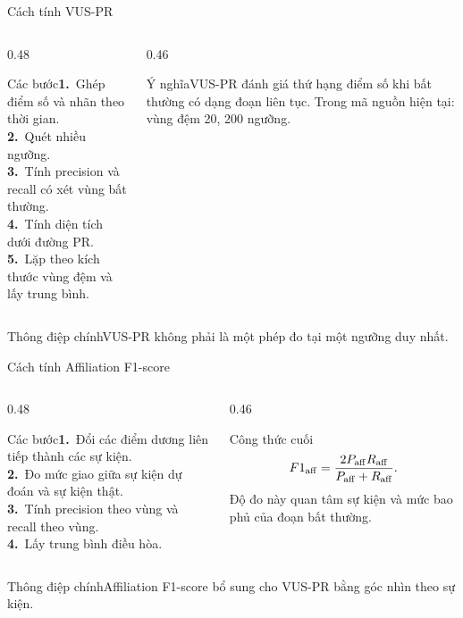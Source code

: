 \documentclass[aspectratio=169]{beamer}
\newcommand{\takeaway}[1]{\begin{alertblock}{Thông điệp chính}#1\end{alertblock}}
\newcommand{\step}[2]{\textbf{#1.}~#2}
\begin{document}
\begin{frame}{Cách tính VUS-PR}
  \begin{columns}[T,onlytextwidth]
    \begin{column}{0.48\textwidth}\begin{block}{Các bước}\step{1}{Ghép điểm số và nhãn theo thời gian.}\\\step{2}{Quét nhiều ngưỡng.}\\\step{3}{Tính precision và recall có xét vùng bất thường.}\\\step{4}{Tính diện tích dưới đường PR.}\\\step{5}{Lặp theo kích thước vùng đệm và lấy trung bình.}\end{block}\end{column}
    \begin{column}{0.46\textwidth}\begin{exampleblock}{Ý nghĩa}VUS-PR đánh giá thứ hạng điểm số khi bất thường có dạng đoạn liên tục. Trong mã nguồn hiện tại: vùng đệm 20, 200 ngưỡng.\end{exampleblock}\end{column}
  \end{columns}
  \takeaway{VUS-PR không phải là một phép đo tại một ngưỡng duy nhất.}
\end{frame}

\begin{frame}{Cách tính Affiliation F1-score}
  \begin{columns}[T,onlytextwidth]
    \begin{column}{0.48\textwidth}\begin{block}{Các bước}\step{1}{Đổi các điểm dương liên tiếp thành các sự kiện.}\\\step{2}{Đo mức giao giữa sự kiện dự đoán và sự kiện thật.}\\\step{3}{Tính precision theo vùng và recall theo vùng.}\\\step{4}{Lấy trung bình điều hòa.}\end{block}\end{column}
    \begin{column}{0.46\textwidth}\begin{exampleblock}{Công thức cuối}\[F1_{\rm aff}=\frac{2P_{\rm aff}R_{\rm aff}}{P_{\rm aff}+R_{\rm aff}}.\]Độ đo này quan tâm sự kiện và mức bao phủ của đoạn bất thường.\end{exampleblock}\end{column}
  \end{columns}
  \takeaway{Affiliation F1-score bổ sung cho VUS-PR bằng góc nhìn theo sự kiện.}
\end{frame}
\end{document}
